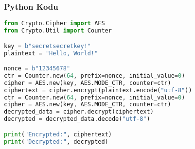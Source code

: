 \subsubsection{Python Kodu}

\begin{lstlisting}[language=Python]
from Crypto.Cipher import AES
from Crypto.Util import Counter

key = b"secretsecretkey!"
plaintext = "Hello, World!"

nonce = b"12345678"
ctr = Counter.new(64, prefix=nonce, initial_value=0)
cipher = AES.new(key, AES.MODE_CTR, counter=ctr)
ciphertext = cipher.encrypt(plaintext.encode("utf-8"))
ctr = Counter.new(64, prefix=nonce, initial_value=0)
cipher = AES.new(key, AES.MODE_CTR, counter=ctr)
decrypted_data = cipher.decrypt(ciphertext)
decrypted = decrypted_data.decode("utf-8")

print("Encrypted:", ciphertext)
print("Decrypted:", decrypted)
\end{lstlisting}

\newpage